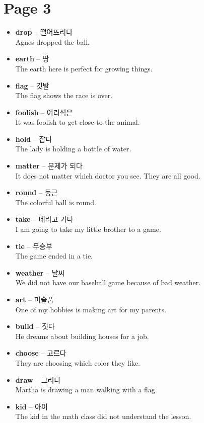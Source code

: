 \documentclass[12pt]{article}
\begin{document}
\newpage
\section*{Page 3}
\begin{itemize}
    \item \textbf{drop} -- 떨어뜨리다 \\
    Agnes dropped the ball.
    \item \textbf{earth} -- 땅 \\
    The earth here is perfect for growing things.
    \item \textbf{flag} -- 깃발 \\
    The flag shows the race is over.
    \item \textbf{foolish} -- 어리석은 \\
    It was foolish to get close to the animal.
    \item \textbf{hold} -- 잡다 \\
    The lady is holding a bottle of water.
    \item \textbf{matter} -- 문제가 되다 \\
    It does not matter which doctor you see. They are all good.
    \item \textbf{round} -- 둥근 \\
    The colorful ball is round.
    \item \textbf{take} -- 데리고 가다 \\
    I am going to take my little brother to a game.
    \item \textbf{tie} -- 무승부 \\
    The game ended in a tie.
    \item \textbf{weather} -- 날씨 \\
    We did not have our baseball game because of bad weather.
    \item \textbf{art} -- 미술품 \\
    One of my hobbies is making art for my parents.
    \item \textbf{build} -- 짓다 \\
    He dreams about building houses for a job.
    \item \textbf{choose} -- 고르다 \\
    They are choosing which color they like.
    \item \textbf{draw} -- 그리다 \\
    Martha is drawing a man walking with a flag.
    \item \textbf{kid} -- 아이 \\
    The kid in the math class did not understand the lesson.
\end{itemize}
\end{document}
